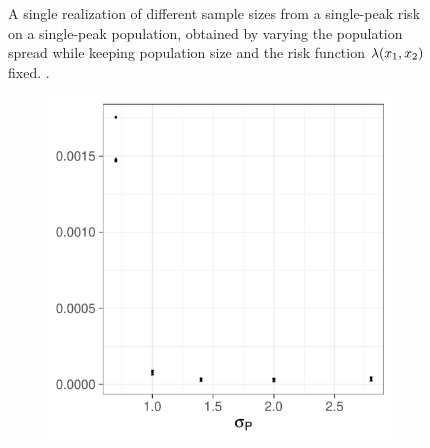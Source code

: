 \begin{figure}[htbp]
\begin{subfigure}{0.45\textwidth}
        \label{fig:one_sample:pop_spread:2.8}
    \end{subfigure}
    \caption[Examples showing population spread]
        {A single realization of different sample sizes from a single-peak risk on a single-peak population, obtained by varying the population \gls{spread} while keeping population size and the risk function $\lambda (x_1, x_2)$ fixed.
        \scatterplotcaption.}
    \label{fig:one_sample:pop_spread}
\end{figure}


\begin{figure}[htbp]
    \centering
    \begin{subfigure}[t]{0.49\textwidth}
        \includegraphics[width=\textwidth]{results/by_population_spread/MISE-vs-population-spread}
        \caption{}
        \label{fig:ise:pop_spread:mise}
    \end{subfigure}
    \begin{subfigure}[t]{0.49\textwidth}

\end{subfigure}
\end{figure}
